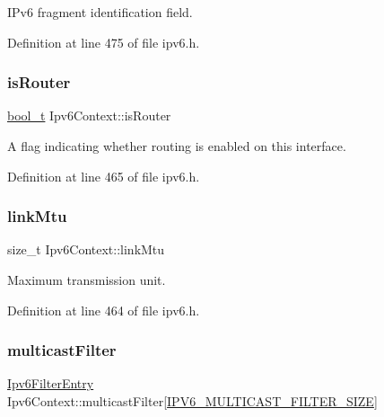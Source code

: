 I\+Pv6 fragment identification field. 



Definition at line 475 of file ipv6.\+h.

\mbox{\label{structIpv6Context_a1c7066fcc3c82e99dc3ab7ff66db78fb}} 
\subsubsection{\texorpdfstring{is\+Router}{isRouter}}
{\footnotesize\ttfamily \hyperlink{compiler__port_8h_a812d16e5494522586b3784e55d479912}{bool\+\_\+t} Ipv6\+Context\+::is\+Router}



A flag indicating whether routing is enabled on this interface. 



Definition at line 465 of file ipv6.\+h.

\mbox{\label{structIpv6Context_a4de9c20bbf842626f4efa346cbb221c6}} 
\subsubsection{\texorpdfstring{link\+Mtu}{linkMtu}}
{\footnotesize\ttfamily size\+\_\+t Ipv6\+Context\+::link\+Mtu}



Maximum transmission unit. 



Definition at line 464 of file ipv6.\+h.

\mbox{\label{structIpv6Context_af8b9f2c394c52382d24f651df2329fbe}} 
\subsubsection{\texorpdfstring{multicast\+Filter}{multicastFilter}}
{\footnotesize\ttfamily \hyperlink{structIpv6FilterEntry}{Ipv6\+Filter\+Entry} Ipv6\+Context\+::multicast\+Filter\mbox{[}\hyperlink{net__config_8h_a76328e1ef9ee7a408d4fb6bcfa62b910}{I\+P\+V6\+\_\+\+M\+U\+L\+T\+I\+C\+A\+S\+T\+\_\+\+F\+I\+L\+T\+E\+R\+\_\+\+S\+I\+ZE}\mbox{]}}



